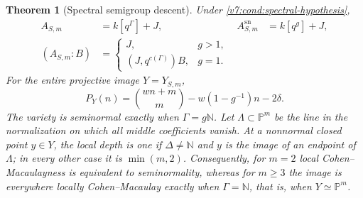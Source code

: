 \documentclass[10pt,fleqn]{article}
\numberwithin{equation}{section}
\newtheorem{theorem}{Theorem}[section]
\newcommand{\PP}{\mathbb P}
\begin{document}
\begin{theorem}[Spectral semigroup descent]\label{v7:cond:semigroup}
Under \eqref{v7:cond:spectral-hypothesis},
\begin{align}
 A_{S,m}&=k[q^\Gamma]+J,
 &A_{S,m}^{\mathrm{sn}}&=k[q^g]+J,\label{v7:cond:semigroup-algebra}\\
 (A_{S,m}:B)&=
 \begin{cases}J,&g>1,\\(J,q^{c(\Gamma)})B,&g=1.\end{cases}
 &&\label{v7:cond:semigroup-conductor}
\end{align}
For the entire projective image $Y=Y_{S,m}$,
\begin{equation}\label{v7:cond:semigroup-hilbert}
 P_Y(n)=\binom{wn+m}{m}-w(1-g^{-1})n-2\delta.
\end{equation}
The variety is seminormal exactly when $\Gamma=g\mathbb N$.
Let $\Lambda\subset\PP^m$ be the line in the normalization
on which all middle coefficients vanish.
At a nonnormal closed point $y\in Y$, the local depth is one
if $\Delta\ne\mathbb N$ and $y$ is the image of an endpoint
of $\Lambda$; in every other case it is $\min(m,2)$.  Consequently, for $m=2$ local
Cohen--Macaulayness is equivalent to seminormality, whereas for $m\ge3$
the image is everywhere locally Cohen--Macaulay exactly when
$\Gamma=\mathbb N$, that is, when $Y\simeq\PP^m$.
\end{theorem}
\end{document}
